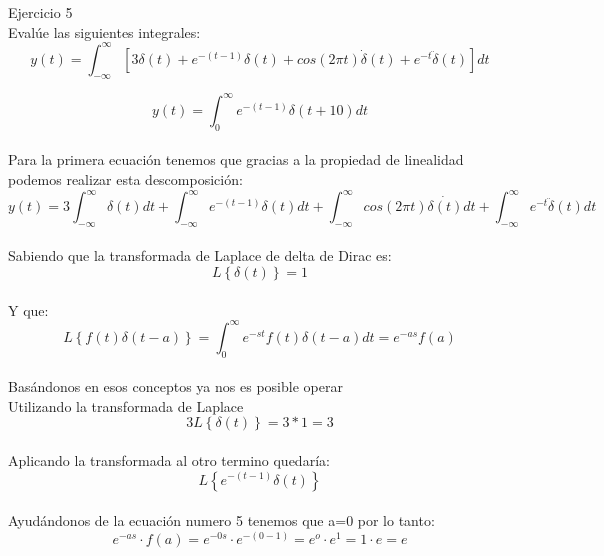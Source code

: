 \documentclass[a4paper,openright,12pt]{report}
\begin{document}
Ejercicio 5\\

Evalúe las siguientes integrales:
\begin{equation}
y(t)=\int_{-\infty }^{\infty }[3\delta (t)+e^{-(t-1)}\delta (t)+cos(2\pi t)\dot{\delta} (t)+e^{-t}\ddot{\delta }(t) ]dt
\end{equation}

\begin{equation}
y(t)=\int_{0}^{\infty }e^{-(t-1)}\delta (t+10)dt
\end{equation}\\

Para la primera ecuación tenemos que gracias a la propiedad de      linealidad podemos realizar esta descomposición:\\

\begin{equation}
y(t)=3\int_{-\infty }^{\infty }\delta (t)dt+\int_{-\infty }^{\infty }e^{-(t-1)}\delta (t)dt+\int_{-\infty }^{\infty }cos(2\pi t)\dot{\delta (t)}dt+\int_{-\infty }^{\infty }e^{-t}\ddot{\delta}(t)dt
\end{equation}\\
Sabiendo que la transformada de Laplace de delta de Dirac es:
\begin{equation}
L\left \{ \delta \left ( t \right ) \right \}=1 
\end{equation}\\
Y que:
\begin{equation}
L\left \{ f(t)\delta (t-a) \right \}=\int_{0 }^{\infty }e^{-st}f(t)\delta (t-a)dt=e^{-as}f(a)
\end{equation}\\
Basándonos en esos conceptos ya nos es posible operar\\
Utilizando la transformada de Laplace
\begin{equation}
3L\left \{ \delta (t) \right \}=3\ast 1=3
\end{equation}\\
Aplicando la transformada al otro termino quedaría:
\begin{equation}
L\left \{ e^{-(t-1)}\delta (t) \right \}
\end{equation}\\
Ayudándonos de la ecuación numero 5 tenemos que a=0 por lo tanto:\\
\begin{equation}
e^{-as}\cdot f(a)=e^{-0s}\cdot e^{-(0-1)}=e^{o}\cdot e^{1}=1\cdot e=e
\end{equation}\\
\end{document}
